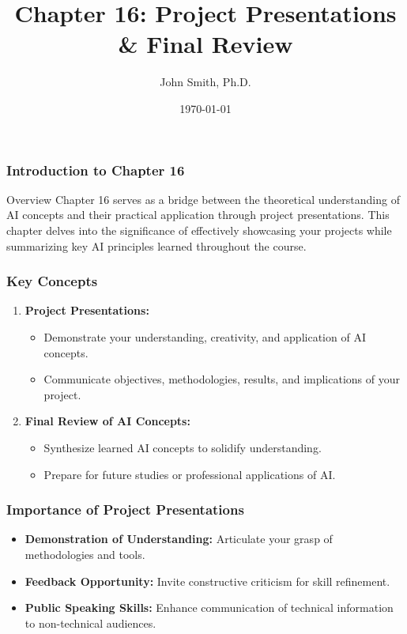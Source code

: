 \documentclass[aspectratio=169]{beamer}
\title[Chapter 16: Project Presentations & Final Review]{Chapter 16: Project Presentations \& Final Review}
\author[J. Smith]{John Smith, Ph.D.}
\institute[University Name]{
  Department of Computer Science\\
  University Name\\
  \vspace{0.3cm}
  Email: email@university.edu\\
  Website: www.university.edu
}
\date{\today}
\begin{document}
\frame{\titlepage}

\begin{frame}[fragile]
    \frametitle{Introduction to Chapter 16}
    \begin{block}{Overview}
        Chapter 16 serves as a bridge between the theoretical understanding of AI concepts and their practical application through project presentations. 
        This chapter delves into the significance of effectively showcasing your projects while summarizing key AI principles learned throughout the course.
    \end{block}
\end{frame}

\begin{frame}[fragile]
    \frametitle{Key Concepts}
    \begin{enumerate}
        \item \textbf{Project Presentations:}
        \begin{itemize}
            \item Demonstrate your understanding, creativity, and application of AI concepts.
            \item Communicate objectives, methodologies, results, and implications of your project.
        \end{itemize}

        \item \textbf{Final Review of AI Concepts:}
        \begin{itemize}
            \item Synthesize learned AI concepts to solidify understanding.
            \item Prepare for future studies or professional applications of AI.
        \end{itemize}
    \end{enumerate}
\end{frame}

\begin{frame}[fragile]
    \frametitle{Importance of Project Presentations}
    \begin{itemize}
        \item \textbf{Demonstration of Understanding:} Articulate your grasp of methodologies and tools.
        \item \textbf{Feedback Opportunity:} Invite constructive criticism for skill refinement.
        \item \textbf{Public Speaking Skills:} Enhance communication of technical information to non-technical audiences.
    \end{itemize}
\end{frame}
\end{document}
